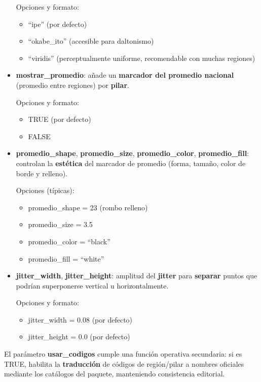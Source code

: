 \documentclass[
  11pt,
  letterpaper,
  DIV=11,
  numbers=noendperiod]{scrartcl}
\begin{document}
\begin{itemize}
  Opciones y formato:

  \begin{itemize}
  \item
    ``ipe'' (por defecto)
  \item
    ``okabe\_ito'' (accesible para daltonismo)
  \item
    ``viridis'' (perceptualmente uniforme, recomendable con muchas
    regiones)
  \end{itemize}
\item
  \textbf{mostrar\_promedio}: añade un \textbf{marcador del promedio
  nacional} (promedio entre regiones) por \textbf{pilar}.

  Opciones y formato:

  \begin{itemize}
  \item
    TRUE (por defecto)
  \item
    FALSE
  \end{itemize}
\item
  \textbf{promedio\_shape}, \textbf{promedio\_size},
  \textbf{promedio\_color}, \textbf{promedio\_fill}: controlan la
  \textbf{estética} del marcador de promedio (forma, tamaño, color de
  borde y relleno).

  Opciones (típicas):

  \begin{itemize}
  \item
    promedio\_shape = 23 (rombo relleno)
  \item
    promedio\_size = 3.5
  \item
    promedio\_color = ``black''
  \item
    promedio\_fill = ``white''
  \end{itemize}
\item
  \textbf{jitter\_width}, \textbf{jitter\_height}: amplitud del
  \textbf{jitter} para \textbf{separar} puntos que podrían superponerse
  vertical u horizontalmente.

  Opciones y formato:

  \begin{itemize}
  \item
    jitter\_width = 0.08 (por defecto)
  \item
    jitter\_height = 0.0 (por defecto)
  \end{itemize}
\end{itemize}

El parámetro \textbf{usar\_codigos} cumple una función operativa
secundaria: si es TRUE, habilita la \textbf{traducción} de códigos de
región/pilar a nombres oficiales mediante los catálogos del paquete,
manteniendo consistencia editorial.
\end{document}
